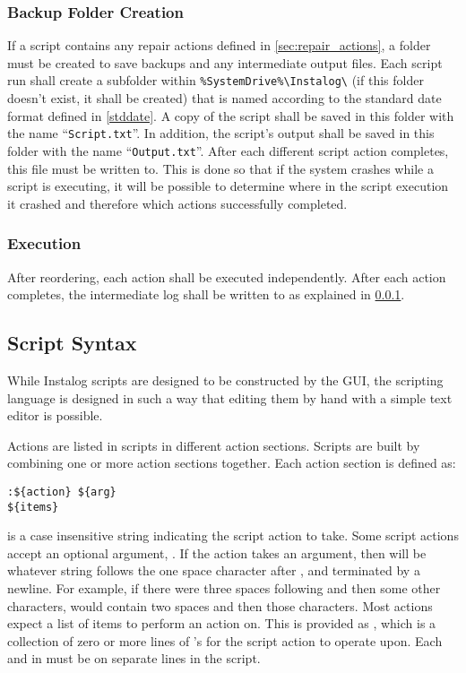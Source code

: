 \subsubsection{Backup Folder Creation} \label{sec:backup_folder}
If a script contains any repair actions defined in \ref{sec:repair_actions}, a
folder must be created to save backups and any intermediate output files.  Each
script run shall create a subfolder within \verb|%SystemDrive%\Instalog\| (if
this folder
doesn't exist, it shall be created) that is named according to the standard date
format defined in \ref{stddate}.  A copy of the script shall be saved in this
folder with the name ``\verb|Script.txt|''.  In addition, the script's output
shall be saved in this folder with the name ``\verb|Output.txt|''.  After each
different script action completes, this file must be written to.  This is done
so that if the system crashes while a script is executing, it will be possible
to determine where in the script execution it crashed and therefore which
actions successfully completed.

\subsubsection{Execution}
After reordering, each action shall be executed independently.  After each
action completes, the intermediate log shall be written to as explained in
\ref{sec:backup_folder}.

\subsection{Script Syntax} \label{sec:script_syntax}
While Instalog scripts are designed to be constructed by the GUI, the scripting
language is designed in such a way that editing them by hand with a simple text
editor is possible.  

Actions are listed in scripts in different action sections.  Scripts are built
by combining one or more action sections together.  Each action section is
defined as:
\begin{verbatim}
:${action} ${arg}
${items}
\end{verbatim}
 is a case insensitive string indicating the script action to take. 
Some script actions accept an optional argument, .  If the action takes an argument,
then  will be whatever string follows the one space character after
, and terminated by a newline.  For example, if there were three
spaces following  and then some other characters,  would contain two spaces and then
those characters.  Most actions expect a list of items to perform an action on. 
This is provided as , which is a collection of zero or more lines of
's for the script action to operate upon.  Each  and
 in  must be on separate lines in the script.

